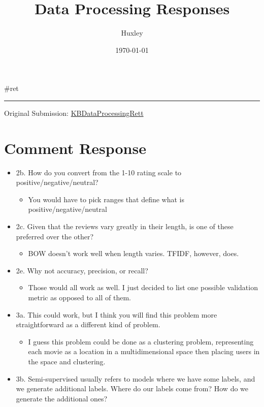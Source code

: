 \documentclass[letterpaper]{article}
\author{Huxley}
\date{\today}
\title{Data Processing Responses}
\renewcommand\maketitle{}
\begin{document}
\maketitle
\#ret

\noindent\rule{\textwidth}{0.5pt}

Original Submission:
\href{KBDataProcessingRett.org}{KBDataProcessingRett}

\section{Comment Response}
\label{sec:org9669b98}
\begin{itemize}
\item 2b. How do you convert from the 1-10 rating scale to
positive/negative/neutral?

\begin{itemize}
\item You would have to pick ranges that define what is
positive/negative/neutral
\end{itemize}

\item 2c. Given that the reviews vary greatly in their length, is one of
these preferred over the other?

\begin{itemize}
\item BOW doesn't work well when length varies. TFIDF, however, does.
\end{itemize}

\item 2e. Why not accuracy, precision, or recall?

\begin{itemize}
\item Those would all work as well. I just decided to list one possible
validation metric as opposed to all of them.
\end{itemize}

\item 3a. This could work, but I think you will find this problem more
straightforward as a different kind of problem.

\begin{itemize}
\item I guess this problem could be done as a clustering problem,
representing each movie as a location in a multidimensional space
then placing users in the space and clustering.
\end{itemize}

\item 3b. Semi-supervised usually refers to models where we have some
labels, and we generate additional labels. Where do our labels come
from? How do we generate the additional ones?


\end{itemize}
\end{document}
